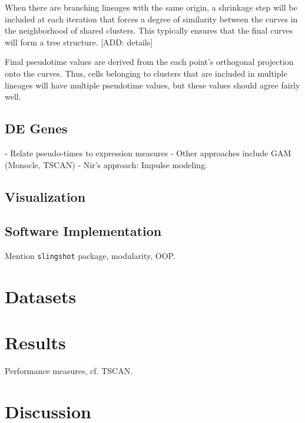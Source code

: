 \documentclass[11pt]{article}\usepackage[]{graphicx}\usepackage[]{color}
\begin{document}
When there are branching lineages with the same origin, a shrinkage step will be included at each iteration that forces a degree of similarity between the curves in the neighborhood of shared clusters. This typically ensures that the final curves will form a tree structure. [ADD: details]

Final pseudotime values are derived from the each point’s orthogonal projection onto the curves. Thus, cells belonging to clusters that are included in multiple lineages will have multiple pseudotime values, but these values should agree fairly well.


\subsection{DE Genes}
- Relate pseudo-times to expression measures
- Other approaches include GAM (Monocle, TSCAN)
- Nir's approach: Impulse modeling. 


\subsection{Visualization}


\subsection{Software Implementation}
Mention \texttt{slingshot} package, modularity, OOP.

\section{Datasets}

\section{Results}
Performance measures, cf. TSCAN.

\section{Discussion}
\end{document}

